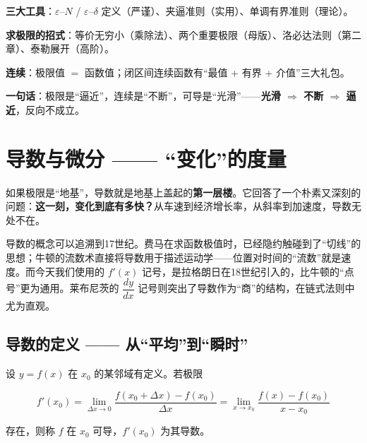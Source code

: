 \documentclass[11pt,a4paper]{article}
\newcommand{\keyw}[1]{\colorbox{cYellowL}{\textbf{\color{cOrange}#1}}}
\begin{document}
\begin{sumbox}
\begin{cndot}
  \item \textbf{三大工具}：$\varepsilon$–$N$ / $\varepsilon$–$\delta$ 定义（严谨）、夹逼准则（实用）、单调有界准则（理论）。
  \item \textbf{求极限的招式}：等价无穷小（乘除法）、两个重要极限（母版）、洛必达法则（第二章）、泰勒展开（高阶）。
  \item \textbf{连续}：极限值 $=$ 函数值；闭区间连续函数有“最值 + 有界 + 介值”三大礼包。
  \item \textbf{一句话}：极限是“逼近”，连续是“不断”，可导是“光滑”——\keyw{光滑 $\Rightarrow$ 不断 $\Rightarrow$ 逼近}，反向不成立。
\end{cndot}
\end{sumbox}

\newpage

\section{导数与微分 —— “变化”的度量}

\begin{leadbox}[本章导读]
如果极限是“地基”，导数就是地基上盖起的\keyw{第一层楼}。它回答了一个朴素又深刻的问题：\textbf{这一刻，变化到底有多快？}从车速到经济增长率，从斜率到加速度，导数无处不在。
\end{leadbox}

导数的概念可以追溯到17世纪。费马在求函数极值时，已经隐约触碰到了“切线”的思想；牛顿的流数术直接将导数用于描述运动学——位置对时间的“流数”就是速度。而今天我们使用的 $f'(x)$ 记号，是拉格朗日在18世纪引入的，比牛顿的“点号”更为通用。莱布尼茨的 $\dfrac{dy}{dx}$ 记号则突出了导数作为“商”的结构，在链式法则中尤为直观。

\subsection{导数的定义 —— 从“平均”到“瞬时”}

\begin{defbox}[导数定义]
设 $y=f(x)$ 在 $x_0$ 的某邻域有定义。若极限
\begin{eqbox}\[ f'(x_0)=\lim_{\Delta x\to 0}\frac{f(x_0+\Delta x)-f(x_0)}{\Delta x}
   =\lim_{x\to x_0}\frac{f(x)-f(x_0)}{x-x_0} \]\end{eqbox}
存在，则称 $f$ 在 $x_0$ 可导，$f'(x_0)$ 为其导数。
\end{defbox}
\end{document}
